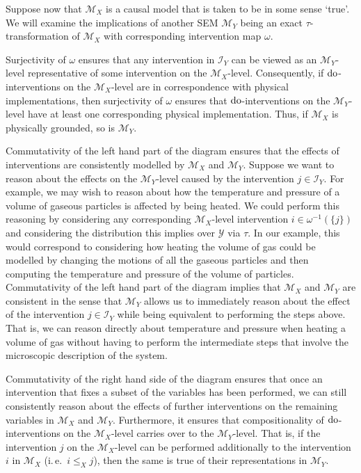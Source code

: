 Suppose now that $\mathcal{M}_X$ is a causal model that is taken to be in some sense `true'.
We will examine the implications of another SEM $\mathcal{M}_Y$ being an exact $\tau$-transformation of $\mathcal{M}_X$ with corresponding intervention map $\omega$.

Surjectivity of $\omega$ ensures that any intervention in $\mathcal{I}_Y$ can be viewed as an $\mathcal{M}_Y$-level representative of some intervention on the $\mathcal{M}_X$-level. Consequently, if $\operatorname{do}$-interventions on the $\mathcal{M}_X$-level are in correspondence with physical implementations, then surjectivity of $\omega$ ensures that $\operatorname{do}$-interventions on the $\mathcal{M}_Y$-level have at least one corresponding physical implementation.
Thus, if $\mathcal{M}_X$ is physically grounded, so is $\mathcal{M}_Y$.

Commutativity of the left hand part of the diagram ensures that the effects of interventions are consistently modelled by $\mathcal{M}_X$ and $\mathcal{M}_Y$.
Suppose we want to reason about the effects on the $\mathcal{M}_Y$-level caused by the intervention $j \in \mathcal{I}_Y$.
For example, we may wish to reason about how the temperature and pressure of a volume of gaseous particles is affected by being heated.
We could perform this reasoning by considering any corresponding $\mathcal{M}_X$-level intervention $i \in \omega^{-1}(\{j\})$ and considering the distribution this implies over $\mathcal{Y}$ via $\tau$.
In our example, this would correspond to considering how heating the volume of gas could be modelled by changing the motions of all the gaseous particles and then computing the temperature and pressure of the volume of particles.
Commutativity of the left hand part of the diagram implies that $\mathcal{M}_X$ and $\mathcal{M}_Y$ are consistent in the sense that $\mathcal{M}_Y$ allows us to immediately reason about the effect of the intervention $j\in\mathcal{I}_Y$ while being equivalent to performing the steps above.
That is, we can reason directly about temperature and pressure when heating a volume of gas without having to perform the intermediate steps that involve the microscopic description of the system.

Commutativity of the right hand side of the diagram ensures that once an intervention that fixes a subset of the variables has been performed, we can still consistently reason about the effects of further interventions on the remaining variables in $\mathcal{M}_X$ and $\mathcal{M}_Y$.
Furthermore, it ensures that compositionality of $\operatorname{do}$-interventions on the $\mathcal{M}_X$-level carries over to the $\mathcal{M}_Y$-level.
That is, if the intervention $j$ on the $\mathcal{M}_X$-level can be performed additionally to the intervention $i$ in $\mathcal{M}_X$ (i.\,e.\ $i\leq_X j$), then the same is true of their representations in $\mathcal{M}_Y$.

